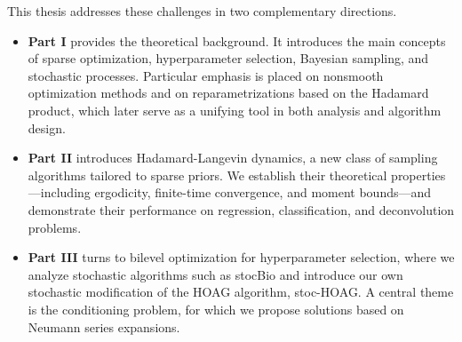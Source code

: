 \documentclass[11pt, twoside]{report}
\begin{document}
This thesis addresses these challenges in two complementary directions.
\begin{itemize}
    \item \textbf{Part I} provides the theoretical background. It introduces the main concepts of
    sparse optimization, hyperparameter selection, Bayesian sampling, and stochastic processes.
    Particular emphasis is placed on nonsmooth optimization methods and on reparametrizations
    based on the Hadamard product, which later serve as a unifying tool in both analysis
    and algorithm design.
    \item \textbf{Part II} introduces Hadamard-Langevin dynamics, a new class of sampling
    algorithms tailored to sparse priors. We establish their theoretical properties---including
    ergodicity, finite-time convergence, and moment bounds---and demonstrate their performance
    on regression, classification, and deconvolution problems.
    \item \textbf{Part III} turns to bilevel optimization for hyperparameter selection,
    where we analyze stochastic algorithms such as stocBio and introduce our own stochastic modification of the HOAG algorithm, stoc-HOAG. A central theme is the
    conditioning problem, for which we propose solutions based on Neumann series expansions.
\end{itemize}
\end{document}
